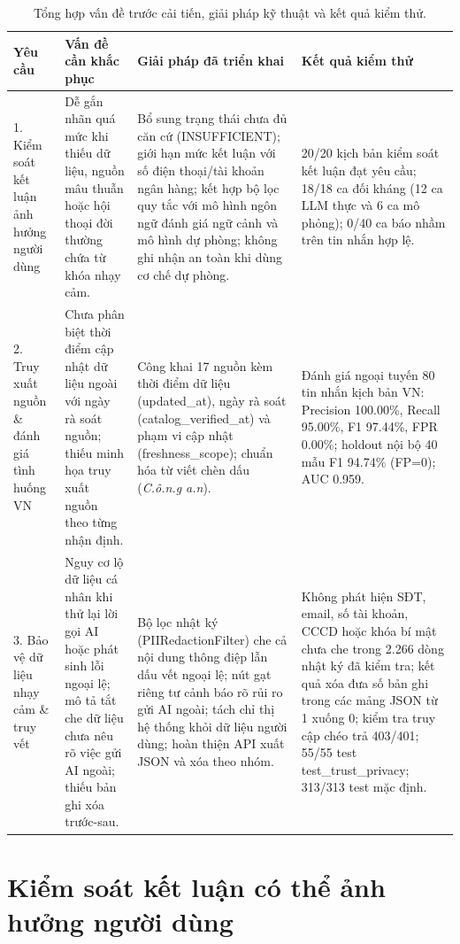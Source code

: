 \documentclass[10pt,a4paper]{article}
\newcommand{\codenobreak}[1]{\mbox{\normalfont\ttfamily\small #1}}
\begin{document}
\begin{table}[ht]
\centering
\caption{Tổng hợp vấn đề trước cải tiến, giải pháp kỹ thuật và kết quả kiểm thử.}
\small
\begin{tabularx}{\textwidth}{@{}L{2.8cm} L{3.9cm} L{4.7cm} Y@{}}
\toprule
\textbf{Yêu cầu} & \textbf{Vấn đề cần khắc phục} & \textbf{Giải pháp đã triển khai} & \textbf{Kết quả kiểm thử} \\
. Kiểm soát kết luận ảnh hưởng người dùng &
Dễ gắn nhãn quá mức khi thiếu dữ liệu, nguồn mâu thuẫn hoặc hội thoại đời thường chứa từ khóa nhạy cảm. &
Bổ sung trạng thái chưa đủ căn cứ (\codenobreak{INSUFFICIENT}); giới hạn mức kết luận với số điện thoại/tài khoản ngân hàng; kết hợp bộ lọc quy tắc với mô hình ngôn ngữ đánh giá ngữ cảnh và mô hình dự phòng; không ghi nhận an toàn khi dùng cơ chế dự phòng. &
20/20 kịch bản kiểm soát kết luận đạt yêu cầu; 18/18 ca đối kháng (12 ca LLM thực và 6 ca mô phỏng); 0/40 ca báo nhầm trên tin nhắn hợp lệ. \\
. Truy xuất nguồn \& đánh giá tình huống VN &
Chưa phân biệt thời điểm cập nhật dữ liệu ngoài với ngày rà soát nguồn; thiếu minh họa truy xuất nguồn theo từng nhận định. &
Công khai 17 nguồn kèm thời điểm dữ liệu (\codenobreak{updated\_at}), ngày rà soát (\codenobreak{catalog\_verified\_at}) và phạm vi cập nhật (\codenobreak{freshness\_scope}); chuẩn hóa từ viết chèn dấu (\textit{C.ô.n.g a.n}). &
Đánh giá ngoại tuyến 80 tin nhắn kịch bản VN: Precision 100.00\%, Recall 95.00\%, F1 97.44\%, FPR 0.00\%; holdout nội bộ 40 mẫu F1 94.74\% (FP=0); AUC 0.959. \\
. Bảo vệ dữ liệu nhạy cảm \& truy vết &
Nguy cơ lộ dữ liệu cá nhân khi thử lại lời gọi AI hoặc phát sinh lỗi ngoại lệ; mô tả tắt che dữ liệu chưa nêu rõ việc gửi AI ngoài; thiếu bản ghi xóa trước-sau. &
Bộ lọc nhật ký (\codenobreak{PIIRedactionFilter}) che cả nội dung thông điệp lẫn dấu vết ngoại lệ; nút gạt riêng tư cảnh báo rõ rủi ro gửi AI ngoài; tách chỉ thị hệ thống khỏi dữ liệu người dùng; hoàn thiện API xuất JSON và xóa theo nhóm. &
Không phát hiện SĐT, email, số tài khoản, CCCD hoặc khóa bí mật chưa che trong 2.266 dòng nhật ký đã kiểm tra; kết quả xóa đưa số bản ghi trong các mảng JSON từ 1 xuống 0; kiểm tra truy cập chéo trả 403/401; 55/55 test \codenobreak{test\_trust\_privacy}; 313/313 test mặc định. \\
\bottomrule
\end{tabularx}
\end{table}

\section{Kiểm soát kết luận có thể ảnh hưởng người dùng}
\end{document}
